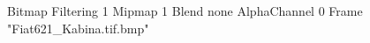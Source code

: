 {Bitmap
	{Filtering 1}
	{Mipmap 1}
	{Blend none}
	{AlphaChannel 0}
	{Frame "Fiat621_Kabina.tif.bmp"}
}
